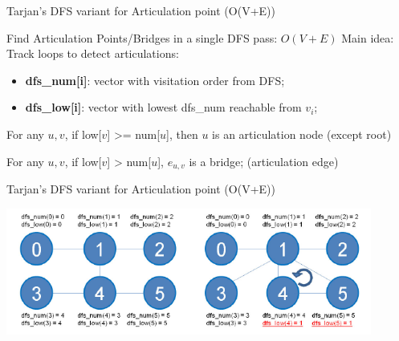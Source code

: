 \begin{frame}{Tarjan's DFS variant for Articulation point (O(V+E))}
  \begin{exampleblock}{Find Articulation Points/Bridges in a single DFS pass: $O(V+E)$}
    Main idea: Track loops to detect articulations:
    \begin{itemize}
    \item {\bf dfs\_num[i]}: vector with visitation order from DFS;
    \item {\bf dfs\_low[i]}: vector with lowest dfs\_num reachable from $v_i$;\hfill
    \end{itemize}\bigskip

    For any $u,v$, if low[$v$] >= num[$u$], then $u$ is an articulation node (except root)\bigskip

    For any $u,v$, if low[$v$] > num[$u$], $e_{u,v}$ is a bridge; (articulation edge)
  \end{exampleblock}
\end{frame}

\begin{frame}{Tarjan's DFS variant for Articulation point (O(V+E))}

  \begin{center}
    \includegraphics[width=0.9\textwidth]{../img/graph_articulation}
  \end{center}
\end{frame}

